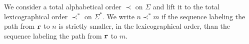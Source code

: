 \documentclass[10pt,conference,letterpaper,twocolumn]{IEEEtran}
\begin{document}

We consider a total alphabetical order $\prec$ on $\Sigma$ and lift it
to the total lexicographical order $\prec^*$ on $\Sigma^*$. We write
$n \prec^* m$ if the sequence labeling the path from $\mathtt{r}$ to
$n$ is strictly smaller, in the lexicographical order, than the
sequence labeling the path from $\mathtt{r}$ to $m$. 
\end{document}

